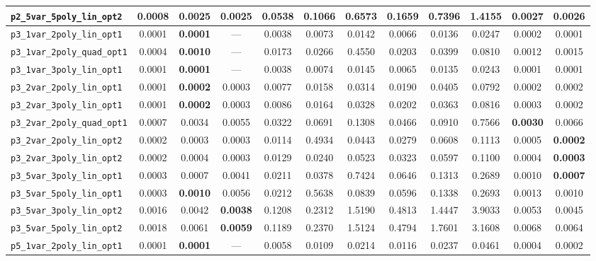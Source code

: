 \begin{landscape}
\begin{table}[H]
{\begin{tabular}{lccccccccccc}
\hline
\texttt{p2\_5var\_5poly\_lin\_opt2} & 0.0008 & \textbf{0.0025} & 0.0025 & 0.0538 & 0.1066 & 0.6573 & 0.1659 & 0.7396 & 1.4155 & 0.0027 & 0.0026 \\
\hline
\texttt{p3\_1var\_2poly\_lin\_opt1} & 0.0001 & \textbf{0.0001} & --- & 0.0038 & 0.0073 & 0.0142 & 0.0066 & 0.0136 & 0.0247 & 0.0002 & 0.0001 \\
\hline
\texttt{p3\_1var\_2poly\_quad\_opt1} & 0.0004 & \textbf{0.0010} & --- & 0.0173 & 0.0266 & 0.4550 & 0.0203 & 0.0399 & 0.0810 & 0.0012 & 0.0015 \\
\hline
\texttt{p3\_1var\_3poly\_lin\_opt1} & 0.0001 & \textbf{0.0001} & --- & 0.0038 & 0.0074 & 0.0145 & 0.0065 & 0.0135 & 0.0243 & 0.0001 & 0.0001 \\
\hline
\texttt{p3\_2var\_2poly\_lin\_opt1} & 0.0001 & \textbf{0.0002} & 0.0003 & 0.0077 & 0.0158 & 0.0314 & 0.0190 & 0.0405 & 0.0792 & 0.0002 & 0.0002 \\
\hline
\texttt{p3\_2var\_3poly\_lin\_opt1} & 0.0001 & \textbf{0.0002} & 0.0003 & 0.0086 & 0.0164 & 0.0328 & 0.0202 & 0.0363 & 0.0816 & 0.0003 & 0.0002 \\
\hline
\texttt{p3\_2var\_2poly\_quad\_opt1} & 0.0007 & 0.0034 & 0.0055 & 0.0322 & 0.0691 & 0.1308 & 0.0466 & 0.0910 & 0.7566 & \textbf{0.0030} & 0.0066 \\
\hline
\texttt{p3\_2var\_2poly\_lin\_opt2} & 0.0002 & 0.0003 & 0.0003 & 0.0114 & 0.4934 & 0.0443 & 0.0279 & 0.0608 & 0.1113 & 0.0005 & \textbf{0.0002} \\
\hline
\texttt{p3\_2var\_3poly\_lin\_opt2} & 0.0002 & 0.0004 & 0.0003 & 0.0129 & 0.0240 & 0.0523 & 0.0323 & 0.0597 & 0.1100 & 0.0004 & \textbf{0.0003} \\
\hline
\texttt{p3\_5var\_3poly\_lin\_opt1} & 0.0003 & 0.0007 & 0.0041 & 0.0211 & 0.0378 & 0.7424 & 0.0646 & 0.1313 & 0.2689 & 0.0010 & \textbf{0.0007} \\
\hline
\texttt{p3\_5var\_5poly\_lin\_opt1} & 0.0003 & \textbf{0.0010} & 0.0056 & 0.0212 & 0.5638 & 0.0839 & 0.0596 & 0.1338 & 0.2693 & 0.0013 & 0.0010 \\
\hline
\texttt{p3\_5var\_3poly\_lin\_opt2} & 0.0016 & 0.0042 & \textbf{0.0038} & 0.1208 & 0.2312 & 1.5190 & 0.4813 & 1.4447 & 3.9033 & 0.0053 & 0.0045 \\
\hline
\texttt{p3\_5var\_5poly\_lin\_opt2} & 0.0018 & 0.0061 & \textbf{0.0059} & 0.1189 & 0.2370 & 1.5124 & 0.4794 & 1.7601 & 3.1608 & 0.0068 & 0.0064 \\
\hline
\texttt{p5\_1var\_2poly\_lin\_opt1} & 0.0001 & \textbf{0.0001} & --- & 0.0058 & 0.0109 & 0.0214 & 0.0116 & 0.0237 & 0.0461 & 0.0004 & 0.0002 \\

\end{tabular}}
\end{table}
\end{landscape}
